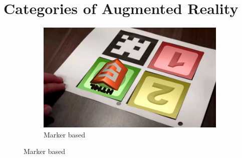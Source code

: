 \documentclass[12 pct]{report}
\begin{document}
\section{Categories of Augmented Reality}
\begin{figure}[h!]
  \centering
  \begin{subfigure}[b]{0.36\linewidth}
    \includegraphics[width=\linewidth]{marker-based}
     \caption{Marker based}
     

\end{subfigure}
\end{figure}
\end{document}
